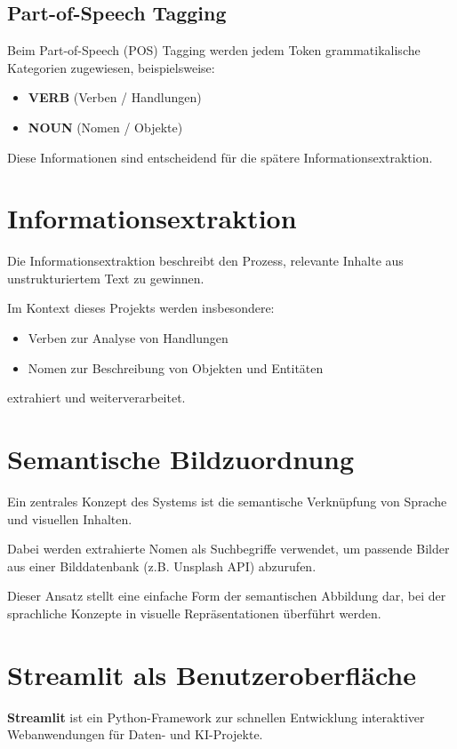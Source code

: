 \subsection{Part-of-Speech Tagging}
Beim Part-of-Speech (POS) Tagging werden jedem Token grammatikalische Kategorien zugewiesen, beispielsweise:
\begin{itemize}
    \item \textbf{VERB} (Verben / Handlungen)
    \item \textbf{NOUN} (Nomen / Objekte)
\end{itemize}

Diese Informationen sind entscheidend für die spätere Informationsextraktion.

\section{Informationsextraktion}
Die Informationsextraktion beschreibt den Prozess, relevante Inhalte aus unstrukturiertem Text zu gewinnen.

Im Kontext dieses Projekts werden insbesondere:
\begin{itemize}
    \item Verben zur Analyse von Handlungen
    \item Nomen zur Beschreibung von Objekten und Entitäten
\end{itemize}

extrahiert und weiterverarbeitet.

\section{Semantische Bildzuordnung}
Ein zentrales Konzept des Systems ist die semantische Verknüpfung von Sprache und visuellen Inhalten.

Dabei werden extrahierte Nomen als Suchbegriffe verwendet, um passende Bilder aus einer Bilddatenbank (z.B. Unsplash API) abzurufen.

Dieser Ansatz stellt eine einfache Form der semantischen Abbildung dar, bei der sprachliche Konzepte in visuelle Repräsentationen überführt werden.

\section{Streamlit als Benutzeroberfläche}
\textbf{Streamlit} ist ein Python-Framework zur schnellen Entwicklung interaktiver Webanwendungen für Daten- und KI-Projekte.

